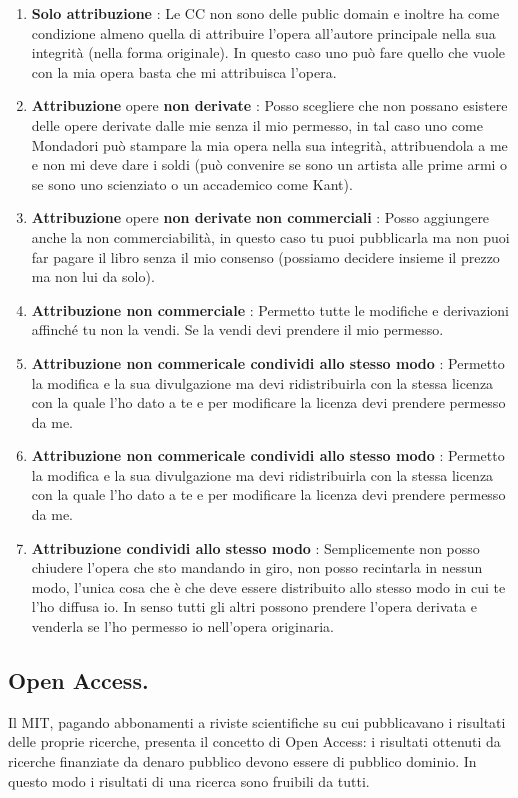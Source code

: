 \documentclass[a4page, 11pt, twocolumn]{article}
\begin{document}
\begin{enumerate}
\item  \textbf{Solo attribuzione} : Le CC non sono delle public domain e inoltre ha come condizione almeno quella di attribuire l’opera all’autore principale nella sua integrità (nella forma originale). In questo caso uno può fare quello che vuole con la mia opera basta che mi attribuisca l’opera.
\item \textbf{Attribuzione} opere\textbf{ non derivate} : Posso scegliere che non possano esistere delle opere derivate dalle mie senza il mio permesso, in tal caso uno come Mondadori può stampare la mia opera nella sua integrità, attribuendola a me e non mi deve dare i soldi (può convenire se sono un artista alle prime armi o se sono uno scienziato o un accademico come Kant).
\item \textbf{Attribuzione} opere \textbf{non derivate} \textbf{non commerciali} : Posso aggiungere anche la non commerciabilità, in questo caso tu puoi pubblicarla ma non puoi far pagare il libro senza il mio consenso (possiamo decidere insieme il prezzo ma non lui da solo).
\item \textbf{Attribuzione non commerciale} : Permetto tutte le modifiche e derivazioni affinché tu non la vendi. Se la vendi devi prendere il mio permesso.
\item \textbf{Attribuzione non commericale condividi allo stesso modo} : Permetto la modifica e la sua divulgazione ma devi ridistribuirla con la stessa licenza con la quale l’ho dato a te e per modificare la licenza devi prendere permesso da me.
\item \textbf{Attribuzione non commericale condividi allo stesso modo} : Permetto la modifica e la sua divulgazione ma devi ridistribuirla con la stessa licenza con la quale l’ho dato a te e per modificare la licenza devi prendere permesso da me.
\item \textbf{Attribuzione condividi allo stesso modo} : Semplicemente non posso chiudere l’opera che sto mandando in giro, non posso recintarla in nessun modo, l’unica cosa che è che deve essere distribuito allo stesso modo in cui te l’ho diffusa io. In senso tutti gli altri possono prendere l’opera derivata e venderla se l’ho permesso io nell’opera originaria.
\end{enumerate}



\subsection{Open Access.}
Il MIT, pagando abbonamenti a riviste scientifiche su cui pubblicavano i risultati delle proprie ricerche, presenta il concetto di Open Access: i risultati ottenuti da ricerche finanziate da denaro pubblico devono essere di pubblico dominio.
In questo modo i risultati di una ricerca sono fruibili da tutti.
\end{document}

